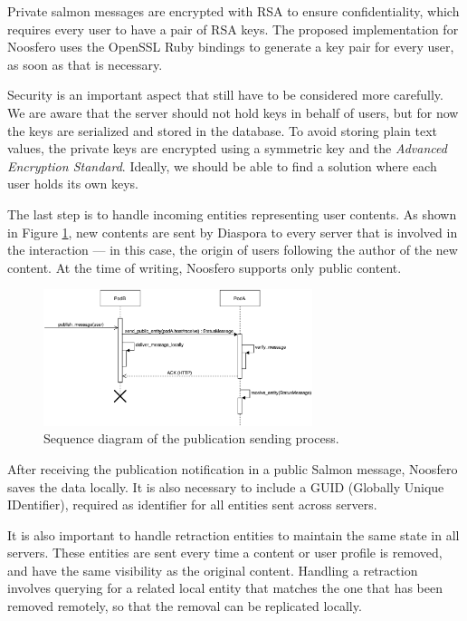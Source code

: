 Private salmon messages are encrypted with RSA to ensure
confidentiality, which requires every user to have a pair of RSA keys.
The proposed implementation for Noosfero uses the OpenSSL Ruby bindings
to generate a key pair for every user, as soon as that is necessary.

Security is an important aspect that still have to be considered more
carefully. We are aware that the server should not hold keys in behalf of
users, but for now the keys are serialized and stored in the database. To avoid
storing plain text values, the private keys are encrypted using a symmetric key
and the \textit{Advanced Encryption Standard}. Ideally, we should be able to
find a solution where each user holds its own keys.

The last step is to handle incoming entities representing user contents.
As shown in Figure \ref{fig:seq_publication}, new contents are sent by
Diaspora to every server that is involved in the interaction --- in this
case, the origin of users following the author of the new content. At
the time of writing, Noosfero supports only public content.

\begin{figure}[h]
	\centering
		\includegraphics[width=0.7\textwidth]{figures/seq_publicacao.eps}
	\caption{Sequence diagram of the publication sending process.}
	\label{fig:seq_publication}
\end{figure}

After receiving the publication notification in a public Salmon message,
Noosfero  saves the data locally. It is also necessary to include a GUID
(Globally Unique IDentifier), required as identifier for all entities sent
across servers.

It is also important to handle retraction entities to maintain the same state
in all servers. These entities are sent every time a content or user profile is
removed, and have the same visibility as the original content.  Handling a
retraction involves querying for a related local entity that matches the one
that has been removed remotely, so that the removal can be replicated locally.
